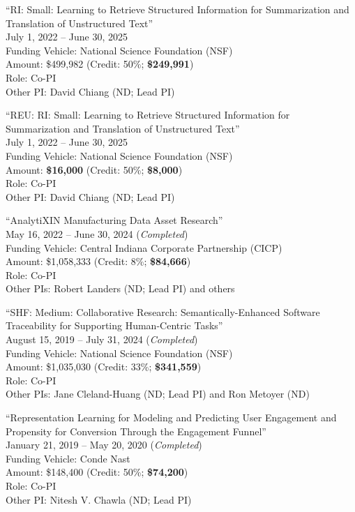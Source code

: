 \documentclass[10pt]{article}
\newenvironment{myindentpar}[1]%
{\begin{list}{}%
         {\setlength{\leftmargin}{#1}}%
         \item[]%
}
{\end{list}}
\newcounter{list}
\begin{document}
\begin{myindentpar}{0.75cm}
\hspace{-0.75cm}``RI: Small: Learning to Retrieve Structured Information for Summarization and Translation of Unstructured Text'' \\
July 1, 2022 -- June 30, 2025 \\
Funding Vehicle: National Science Foundation (NSF) \\
Amount: \$499,982 (Credit: 50\%; \textbf{\$249,991}) \\
Role: {Co-PI} \\
Other PI: David Chiang (ND; Lead PI)

\hspace{-0.75cm}``REU: RI: Small: Learning to Retrieve Structured Information for Summarization and Translation of Unstructured Text'' \\
July 1, 2022 -- June 30, 2025 \\
Funding Vehicle: National Science Foundation (NSF) \\
Amount: \textbf{\$16,000} (Credit: 50\%; \textbf{\$8,000}) \\
Role: {Co-PI} \\
Other PI: David Chiang (ND; Lead PI)

\hspace{-0.75cm}``AnalytiXIN Manufacturing Data Asset Research'' \\
May 16, 2022 -- June 30, 2024 (\emph{Completed}) \\
Funding Vehicle: Central Indiana Corporate Partnership (CICP) \\
Amount: \$1,058,333 (Credit: 8\%; \textbf{\$84,666}) \\
Role: {Co-PI} \\
Other PIs: Robert Landers (ND; Lead PI) and others

\hspace{-0.75cm}``SHF: Medium: Collaborative Research: Semantically-Enhanced Software Traceability for Supporting Human-Centric Tasks'' \\
August 15, 2019 -- July 31, 2024 (\emph{Completed}) \\
Funding Vehicle: National Science Foundation (NSF) \\
Amount: \$1,035,030 (Credit: 33\%; \textbf{\$341,559}) \\
Role: {Co-PI} \\
Other PIs: Jane Cleland-Huang (ND; Lead PI) and Ron Metoyer (ND)

\hspace{-0.75cm}``Representation Learning for Modeling and Predicting User Engagement and Propensity for Conversion Through the Engagement Funnel'' \\
January 21, 2019 -- May 20, 2020 (\emph{Completed}) \\
Funding Vehicle: Conde Nast \\
Amount: \$148,400 (Credit: 50\%; \textbf{\$74,200}) \\
Role: {Co-PI} \\
Other PI: Nitesh V. Chawla (ND; Lead PI)


\end{myindentpar}
\end{document}
